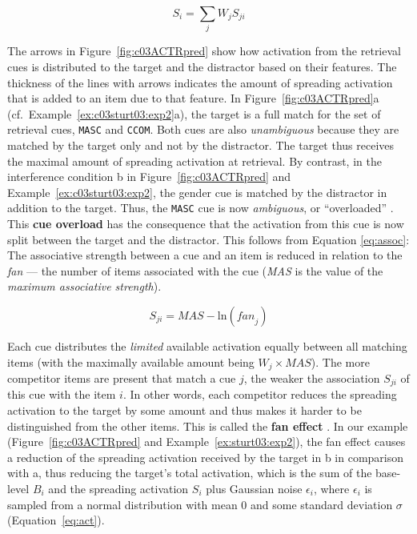 \documentclass{cambridge7A}\usepackage[]{graphicx}\usepackage[]{color}
\newcommand{\actrcue}[1]{\texttt{\uppercase{#1}}}
\begin{document}
\begin{equation}
      S_i = \sum_j W_{j} S_{ji} \label{eq:spread2}
\end{equation}

The arrows in Figure~\ref{fig:c03ACTRpred} show how activation from the retrieval cues is distributed to the target and the distractor based on their features. The thickness of the lines with arrows indicates the amount of spreading activation that is added to an item due to that feature.
In Figure~\ref{fig:c03ACTRpred}a (cf.\ Example~\ref{ex:c03sturt03:exp2}a), the target is a full match for the set of retrieval cues, \actrcue{masc} and \actrcue{ccom}. Both cues are also \emph{unambiguous} because they are matched by the target only and not by the distractor. The target thus receives the maximal amount of spreading activation at retrieval. By contrast, 
in the interference condition b in Figure~\ref{fig:c03ACTRpred} and Example~\ref{ex:c03sturt03:exp2}, the gender cue is matched by the distractor in addition to the target. Thus, the \actrcue{MASC} cue is now \emph{ambiguous}, or ``overloaded'' \citep{WatkinsWatkins1975}. This  \textbf{cue overload} has the consequence that the activation from this cue is now split between the target and the distractor. 
This follows from Equation \ref{eq:assoc}: The associative strength between a cue and an item is reduced in relation to the \emph{fan} --- the number of items associated with the cue (\textit{MAS} is the value of the \emph{maximum associative strength}).

\begin{equation}
  S_{ji} = \textit{MAS} - \text{ln}(\textit{fan}_{j}) \label{eq:assoc}%
\end{equation}

Each cue distributes the \emph{limited} available activation equally between all matching items (with the maximally available amount being $W_j\times\textit{MAS}$).
The more competitor items are present that match a cue $j$, the weaker the association $S_{ji}$ of this cue with the item $i$. In other words, each competitor reduces the spreading activation to the target by some amount and thus makes it harder to be distinguished from the other items.
This is called the  \textbf{fan effect} \citep{anderson1974retrieval}. 
In our example (Figure~\ref{fig:c03ACTRpred} and Example~\ref{ex:sturt03:exp2}), the fan effect causes a reduction of the spreading activation received by the target in b in comparison with a, thus reducing the target's total activation, which is the sum of the base-level $B_i$ and the spreading activation $S_i$ plus Gaussian noise $\epsilon_i$, where $\epsilon_i$ is sampled from a normal distribution with mean 0 and some standard deviation $\sigma$ (Equation~\ref{eq:act}). 
\end{document}

